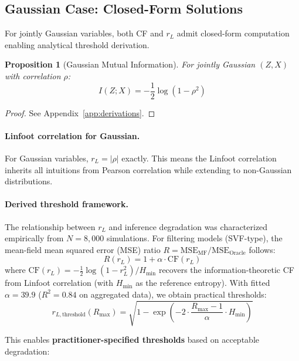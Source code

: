 \documentclass[10pt]{article} %
\theoremstyle{plain}
\newtheorem{proposition}[theorem]{Proposition}
\theoremstyle{definition}
\begin{document}
\subsection{Gaussian Case: Closed-Form Solutions}
\label{sec:gaussian}

For jointly Gaussian variables, both CF and $r_L$ admit closed-form computation enabling analytical threshold derivation.

\begin{proposition}[Gaussian Mutual Information]
\label{prop:gaussian-mi}
For jointly Gaussian $(Z, X)$ with correlation $\rho$:
\begin{equation}
I(Z; X) = -\frac{1}{2}\log(1 - \rho^2)
\end{equation}
\end{proposition}
\begin{proof}
See Appendix~\ref{app:derivations}.
\end{proof}

\paragraph{Linfoot correlation for Gaussian.} For Gaussian variables, $r_L = |\rho|$ exactly. This means the Linfoot correlation inherits all intuitions from Pearson correlation while extending to non-Gaussian distributions.

\paragraph{Derived threshold framework.} The relationship between $r_L$ and inference degradation was characterized empirically from $N = 8{,}000$ simulations. For filtering models (SVF-type), the mean-field mean squared error (MSE) ratio $R = \text{MSE}_{\text{MF}}/\text{MSE}_{\text{Oracle}}$ follows:
\begin{equation}
R(r_L) = 1 + \alpha \cdot \text{CF}(r_L)
\label{eq:svf-threshold}
\end{equation}
where $\text{CF}(r_L) = -\frac{1}{2}\log(1 - r_L^2) / H_{\min}$ recovers the information-theoretic CF from Linfoot correlation (with $H_{\min}$ as the reference entropy). With fitted $\alpha = 39.9$ ($R^2 = 0.84$ on aggregated data), we obtain practical thresholds:
\begin{equation}
r_{L,\text{threshold}}(R_{\max}) = \sqrt{1 - \exp\left(-2 \cdot \frac{R_{\max} - 1}{\alpha} \cdot H_{\min}\right)}
\end{equation}

This enables \textbf{practitioner-specified thresholds} based on acceptable degradation:
\end{document}

